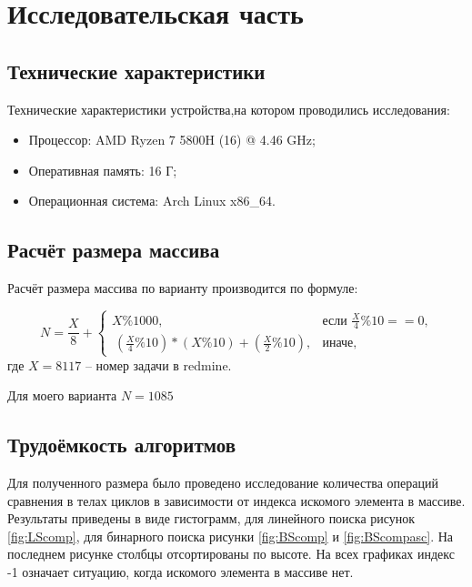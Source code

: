 \chapter{Исследовательская часть}

\section{Технические характеристики}

Технические характеристики устройства,на котором проводились исследования:

\begin{itemize}
	\item Процессор: AMD Ryzen 7 5800H (16) @ 4.46 GHz;
	\item Оперативная память: 16 Г;
	\item Операционная система: Arch Linux x86\_64.
\end{itemize}

\section{Расчёт размера массива}

Расчёт размера массива по варианту производится по формуле:

\begin{equation}
	\label{variant}
	N = \frac{X}{8} + \begin{cases}
		X \% 1000,  &\text{если $\frac{X}{4} \% 10 == 0$,} \\
		\ (\frac{X}{4} \% 10) * (X \% 10) + (\frac{X}{2} \% 10), &\text{иначе},
	\end{cases}
\end{equation}
где $X = 8117$ – номер задачи в redmine.

Для моего варианта $N = 1085$


\section{Трудоёмкость алгоритмов}
Для полученного размера было проведено исследование количества операций сравнения в телах циклов в зависимости от индекса искомого элемента в массиве. Результаты приведены в виде гистограмм, для линейного поиска рисунок \ref{fig:LScomp}, для бинарного поиска рисунки \ref{fig:BScomp} и \ref{fig:BScompasc}. На последнем рисунке столбцы отсортированы по высоте. На всех графиках индекс -1 означает ситуацию, когда искомого элемента в массиве нет.



